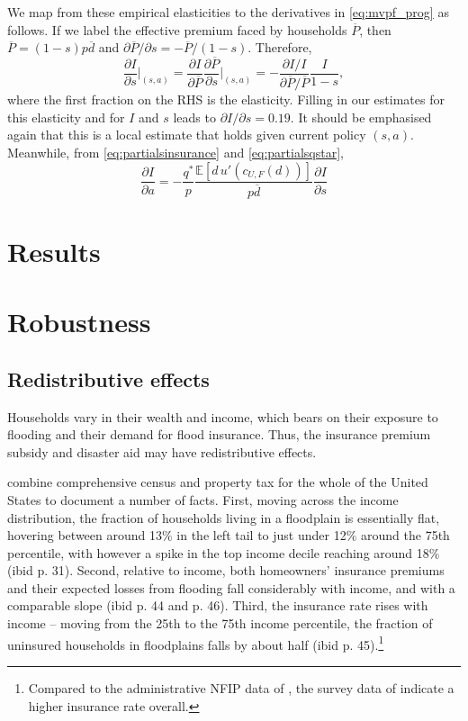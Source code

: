 \documentclass[12pt]{article}
\begin{document}
We map from these empirical elasticities to the derivatives in \eqref{eq:mvpf_prog} as follows. If we label the effective premium faced by households $\overline{P}$, then $\overline{P}=(1-s)p\overline{d}$ and $\partial \overline{P}/\partial s = -\overline{P}/(1-s)$. Therefore,
\begin{equation}\label{eq:insurancedemandwrts}
\frac{\partial I}{\partial s}\bigg|_{(s,a)}=\frac{\partial I}{\partial \overline{P}}\frac{\partial  \overline{P}}{\partial s}\bigg|_{(s,a)}=-\frac{\partial I/I}{\partial\overline{P}/\overline{P}}\frac{I}{1-s},
\end{equation}
where the first fraction on the RHS is the elasticity. Filling in our estimates for this elasticity and for $I$ and $s$ leads to $\partial I/\partial s=0.19$. It should be emphasised again that this is a local estimate that holds given current policy $(s,a)$. Meanwhile, from \eqref{eq:partialsinsurance} and \eqref{eq:partialsqstar}, 
\begin{equation}\label{eq:insurancedemandwrta}
\frac{\partial I}{\partial a}=-\frac{q^*}{p}\frac{\mathbb{E}[d\,u'(c_{U,F}(d))]}{p\overline{d}}\frac{\partial I}{\partial s}
\end{equation}


\section{Results}
\label{sec:results}

\section{Robustness}
\label{sec:robustness}
\subsection{Redistributive effects}
Households vary in their wealth and income, which bears on their exposure to flooding and their demand for flood insurance. Thus, the insurance premium subsidy and disaster aid may  have redistributive effects.

\cite{qin2026flood} combine comprehensive census and property tax for the whole of the United States to document a number of facts. First, moving across the income distribution, the fraction of households living in a floodplain is essentially flat, hovering between around 13$\%$ in the left tail to just under 12$\%$ around the 75th percentile, with however a spike in the top income decile reaching around 18$\%$ (ibid p. 31). Second, relative to income, both homeowners' insurance premiums and their expected losses from flooding fall considerably with income, and with a comparable slope (ibid p. 44 and p. 46). Third, the insurance rate rises with income -- moving from the 25th to the 75th income percentile, the fraction of uninsured households in floodplains falls by about half (ibid p. 45).\footnote{Compared to the administrative NFIP data of \cite{amornsiripanitch2025measuring}, the survey data of \cite{qin2026flood} indicate a higher insurance rate overall.} 
\end{document}
